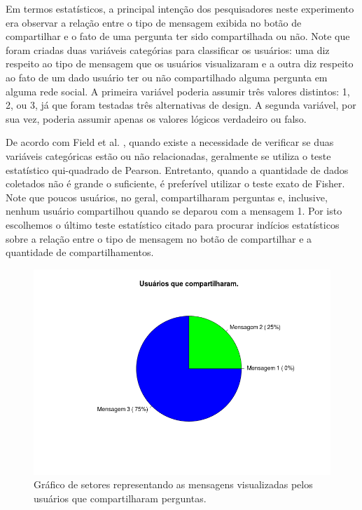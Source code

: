 Em termos estatísticos, a principal intenção dos pesquisadores neste experimento era observar a relação entre o tipo de mensagem exibida no botão de compartilhar e o fato de uma pergunta ter sido compartilhada ou não. Note que foram criadas duas variáveis categórias para classificar os usuários: uma diz respeito ao tipo de mensagem que os usuários visualizaram e a outra diz respeito ao fato de um dado usuário ter ou não compartilhado alguma pergunta em alguma rede social. A primeira variável poderia assumir três valores distintos: 1, 2, ou 3, já que foram testadas três alternativas de design. A segunda variável, por sua vez, poderia assumir apenas os valores lógicos verdadeiro ou falso.

De acordo com Field et al. \cite{field2012discovering}, quando existe a necessidade de verificar se duas variáveis categóricas estão ou não relacionadas, geralmente se utiliza o teste estatístico qui-quadrado de Pearson. Entretanto, quando a quantidade de dados coletados não é grande o suficiente, é preferível utilizar o teste exato de Fisher. Note que poucos usuários, no geral, compartilharam perguntas e, inclusive, nenhum usuário compartilhou quando se deparou com a mensagem 1. Por isto escolhemos o último teste estatístico citado para procurar indícios estatísticos sobre a relação entre o tipo de mensagem no botão de compartilhar e a quantidade de compartilhamentos.

    \begin{figure}[H]
        \center
        \includegraphics[scale=0.4]{./figuras/piechart-compartilharam-2.png}
        \caption{Gráfico de setores representando as mensagens visualizadas pelos usuários que compartilharam perguntas.}
        \label{fig:piechart4}
    \end{figure}
    
